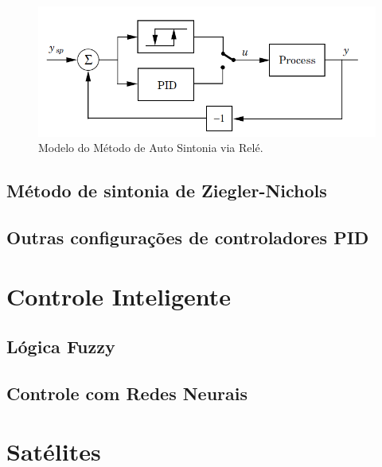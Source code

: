 \begin{figure}[htb]
  \caption{Modelo do Método de Auto Sintonia via Relé.}
  \begin{center}
      \includegraphics[scale=0.75]{img/pid_autotuning_relay_astrom_p239}
  \end{center}
  \label{fig:pid_autotuning_relay_astrom_p239}
\end{figure}

\subsection{Método de sintonia de Ziegler-Nichols}

\subsection{Outras configurações de controladores PID}

\section{Controle Inteligente}

\subsection{Lógica Fuzzy}

\subsection{Controle com Redes Neurais}  %

\section{Satélites}

